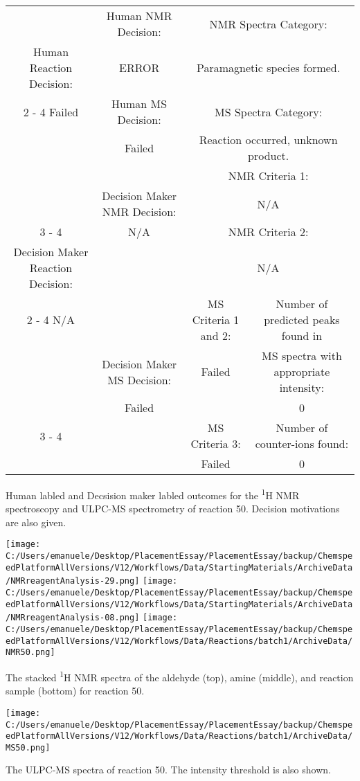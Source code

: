 \documentclass{article}%
\begin{document}
\begin{Decision Table}[H]%
\begin{tabular}{|c|c|c|c|}%
\hline%
&Human NMR Decision:&\multicolumn{2}{|c|}{NMR Spectra Category:}\\%
Human Reaction Decision:&ERROR&\multicolumn{2}{|c|}{Paramagnetic species formed.}\\%
\cline{2%
-%
4}%
Failed&Human MS Decision:&\multicolumn{2}{|c|}{MS Spectra Category:}\\%
&Failed&\multicolumn{2}{|c|}{Reaction occurred, unknown product.}\\%
\hline%
&&\multicolumn{2}{|c|}{NMR Criteria 1:}\\%
&Decision Maker NMR Decision:&\multicolumn{2}{|c|}{N/A}\\%
\cline{3%
-%
4}%
&N/A&\multicolumn{2}{|c|}{NMR Criteria 2:}\\%
Decision Maker Reaction Decision:&&\multicolumn{2}{|c|}{N/A}\\%
\cline{2%
-%
4}%
N/A&&MS Criteria 1 and 2:&Number of predicted peaks found in\\%
&Decision Maker MS Decision:&Failed&MS spectra with appropriate intensity:\\%
&Failed&&0\\%
\cline{3%
-%
4}%
&&MS Criteria 3:&Number of counter{-}ions found:\\%
&&Failed&0\\%
\hline%
\end{tabular}%
\caption{Human labled and Decsision maker labled outcomes for the \textsuperscript{1}H NMR spectroscopy and ULPC-MS spectrometry of reaction 50. Decision motivations are also given.}%
\end{Decision Table}%
\begin{NMR Spectra}[H]%
\begin{center}%
\texttt{[image: C:/Users/emanuele/Desktop/PlacementEssay/PlacementEssay/backup/ChemspeedPlatformAllVersions/V12/Workflows/Data/StartingMaterials/ArchiveData/NMRreagentAnalysis-29.png]}\hfill%
\texttt{[image: C:/Users/emanuele/Desktop/PlacementEssay/PlacementEssay/backup/ChemspeedPlatformAllVersions/V12/Workflows/Data/StartingMaterials/ArchiveData/NMRreagentAnalysis-08.png]}\hfill%
\texttt{[image: C:/Users/emanuele/Desktop/PlacementEssay/PlacementEssay/backup/ChemspeedPlatformAllVersions/V12/Workflows/Data/Reactions/batch1/ArchiveData/NMR50.png]}\hfill%
\end{center}%
\caption{The stacked \textsuperscript{1}H NMR spectra of the aldehyde (top), amine (middle), and reaction sample (bottom) for reaction 50.}%
\end{NMR Spectra}%
\begin{MS Spectra}[H]%
\begin{center}%
\texttt{[image: C:/Users/emanuele/Desktop/PlacementEssay/PlacementEssay/backup/ChemspeedPlatformAllVersions/V12/Workflows/Data/Reactions/batch1/ArchiveData/MS50.png]}\hfill%
\end{center}%
\caption{The ULPC-MS spectra of reaction 50. The intensity threshold is also shown.}%
\end{MS Spectra}%
\end{document}
